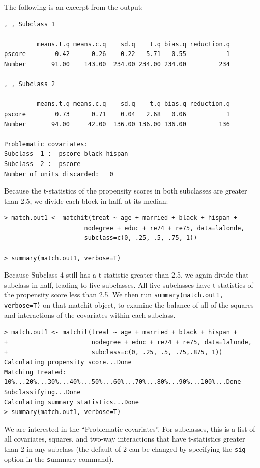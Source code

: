 \documentclass[oneside,letterpaper,titlepage]{article}
\begin{document}
The following is an excerpt from the output:

\begin{verbatim}
, , Subclass 1

         means.t.q means.c.q    sd.q    t.q bias.q reduction.q
pscore        0.42      0.26    0.22   5.71   0.55           1
Number       91.00    143.00  234.00 234.00 234.00         234

, , Subclass 2

         means.t.q means.c.q    sd.q    t.q bias.q reduction.q
pscore        0.73      0.71    0.04   2.68   0.06           1
Number       94.00     42.00  136.00 136.00 136.00         136

Problematic covariates:
Subclass  1 :  pscore black hispan
Subclass  2 :  pscore
Number of units discarded:   0

\end{verbatim}

Because the t-statistics of the propensity scores in both subclasses
are greater than 2.5, we divide each block in half, at its median:

\begin{verbatim}
> match.out1 <- matchit(treat ~ age + married + black + hispan +
                      nodegree + educ + re74 + re75, data=lalonde,                      
                      subclass=c(0, .25, .5, .75, 1))

> summary(match.out1, verbose=T)
\end{verbatim}

Because Subclass 4 still has a t-statistic greater than 2.5, we again
divide that subclass in half, leading to five subclasses.  All five
subclasses have t-statistics of the propensity score less than 2.5.
We then run {\tt summary(match.out1, verbose=T)} on that matchit
object, to examine the balance of all of the squares and interactions
of the covariates within each subclass.

\begin{verbatim}
> match.out1 <- matchit(treat ~ age + married + black + hispan +
+                       nodegree + educ + re74 + re75, data=lalonde,
+                       subclass=c(0, .25, .5, .75,.875, 1))
Calculating propensity score...Done
Matching Treated: 10%...20%...30%...40%...50%...60%...70%...80%...90%...100%...Done
Subclassifying...Done
Calculating summary statistics...Done
> summary(match.out1, verbose=T)
\end{verbatim}

We are interested in the ``Problematic covariates''.  For subclasses,
this is a list of all covariates, squares, and two-way interactions
that have t-statistics greater than $2$ in any subclass (the default
of $2$ can be changed by specifying the \texttt{sig} option in the
{\texttt summary} command).
\end{document}
